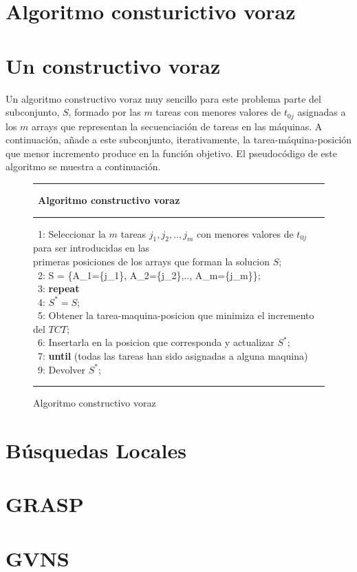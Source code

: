 \section{Algoritmo consturictivo voraz}

\section*{Un constructivo voraz}
Un algoritmo constructivo voraz muy sencillo para este problema parte del subconjunto, $S$, formado por las $m$ tareas con menores valores de $t_{0j}$ asignadas a los $m$ arrays que representan la secuenciaci\'on de tareas en las m\'aquinas. A continuaci\'on, a\~nade a este subconjunto, iterativamente, la tarea-m\'aquina-posici\'on que menor incremento produce en la funci\'on objetivo. El pseudoc\'odigo de este algoritmo se muestra a conti\-nuaci\'on.
\begin{figure}[h!]
{\small
 \hrule \
 {\bf\small Algoritmo constructivo voraz}
 \hrule
\begin{center}
\begin{tabbing}
\ 1: Seleccionar la $m$ tareas $j_1, j_2,.., j_m$ con menores valores de $t_{0j}$ para ser introducidas en las \\ primeras posiciones de los arrays que forman la solucion $S$;\\
\ 2: S = \{A_1=\{j_1\}, A_2=\{j_2\},.., A_m=\{j_m\}\};\\
\ 3: {\bf rep}\={\bf eat}\\
\ 4: \> $S^* = S$;\\
\ 5: \> Obtener la tarea-maquina-posicion que minimiza el incremento del $TCT$;\\
\ 6: \> Insertarla en la posicion que corresponda y actualizar $S^*$;\\
\ 7: {\bf until} (todas las tareas han sido asignadas a alguna maquina)\\
\ 9: Devolver $S^*$;
\end{tabbing}
\end{center}
\hrule
}
\caption{Algoritmo constructivo voraz}
\label{constructivo}
\end{figure}

\section{Búsquedas Locales}


\section{GRASP}



\section{GVNS}


